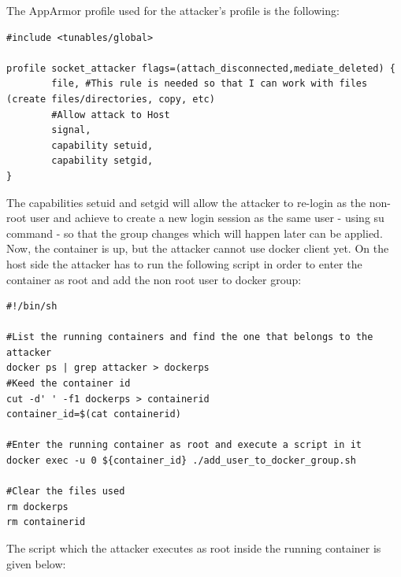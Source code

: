 The AppArmor profile used for the attacker's profile is the following:

\begin{lstlisting}[style=Dockerfile, caption={AppArmor profile socket\_attacker}]
#include <tunables/global>

profile socket_attacker flags=(attach_disconnected,mediate_deleted) {
        file, #This rule is needed so that I can work with files (create files/directories, copy, etc)
        #Allow attack to Host
        signal,
        capability setuid,
        capability setgid,
}
\end{lstlisting}

The capabilities setuid and setgid will allow the attacker to re-login as the non-root user and achieve to create a new login session as the same user - using su command - so that the group changes which will happen later can be applied. 
\\

Now, the container is up, but the attacker cannot use docker client yet. On the host side the attacker has to run the following script in order to enter the container as root and add the non root user to docker group:

\begin{lstlisting}[style=shellscript, caption={3\_exec\_as\_root\_to\_wannabe\_attacker.sh}]
#!/bin/sh

#List the running containers and find the one that belongs to the attacker
docker ps | grep attacker > dockerps
#Keed the container id
cut -d' ' -f1 dockerps > containerid
container_id=$(cat containerid)

#Enter the running container as root and execute a script in it
docker exec -u 0 ${container_id} ./add_user_to_docker_group.sh

#Clear the files used
rm dockerps
rm containerid
\end{lstlisting}

The script which the attacker executes as root inside the running container is given below:

